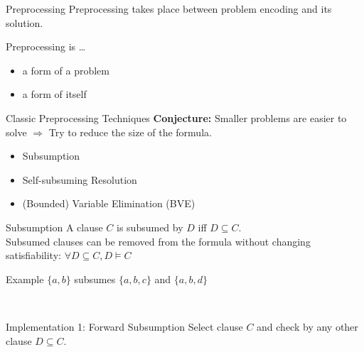 \documentclass[t]{sdqbeamer}
\begin{document}
\begin{frame}{Preprocessing}
Preprocessing takes place between problem encoding and its solution.\\[1ex]
\begin{block}{Preprocessing is \dots}
\begin{itemize}
    \item a form of  a problem
    \item a form of  itself
\end{itemize}
\end{block}
\begin{exampleblock}{Classic Preprocessing Techniques}
\textbf{Conjecture:} Smaller problems are easier to solve $\Longrightarrow$ Try to reduce the size of the formula.\\[1ex]
\begin{itemize}\setlength{\itemsep}{1ex}
    \item Subsumption
    \item Self-subsuming Resolution
    \item (Bounded) Variable Elimination (BVE)
\end{itemize}
\end{exampleblock}
\end{frame}


\begin{frame}{Subsumption}
A clause $C$ is subsumed by $D$ iff $D \subseteq C$.\\[1ex]
Subsumed clauses can be removed from the formula without changing satisfiability: $\forall D \subseteq C, D \models C$
\begin{exampleblock}{Example}
    $\{a, b\}$ subsumes $\{a, b, c\}$ and $\{a, b, d\}$
\end{exampleblock}~\\
\pause
\begin{block}{Implementation 1: Forward Subsumption}
Select clause $C$ and check  by any other clause $D \subseteq C$.~\\[1ex]
~\\[1ex]
\end{block}
\end{frame}
\end{document}
